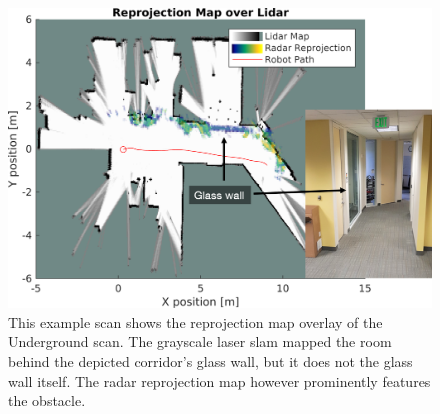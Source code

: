 \begin{figure}[htbp]
    \centering
    \includegraphics[max width=\textwidth]{gfx/diagrams/pres4.png}
    \caption{This example scan shows the reprojection map overlay of the Underground scan. The grayscale laser slam mapped the room behind the depicted corridor's glass wall, but it does not the glass wall itself. The radar reprojection map however prominently features the obstacle.}
    \label{fig:pres4}
\end{figure}